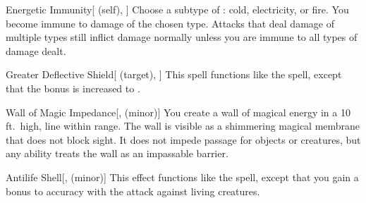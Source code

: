 \lowercase{\hypertarget{spell:Energetic Immunity}{}}\label{spell:Energetic Immunity}
\begin{attuneability}[Rank 5]{\hypertarget{spell:Energetic Immunity}{Energetic Immunity}}[ (self), ]
Choose a subtype of : cold, electricity, or fire.
You become immune to damage of the chosen type.
Attacks that deal damage of multiple types still inflict damage normally unless you are immune to all types of damage dealt.
\end{attuneability}
\vspace{0.25em}



\lowercase{\hypertarget{spell:Greater Deflective Shield}{}}\label{spell:Greater Deflective Shield}
\begin{attuneability}[Rank 5]{\hypertarget{spell:Greater Deflective Shield}{Greater Deflective Shield}}[ (target), ]
This spell functions like the  spell, except that the bonus is increased to .
\end{attuneability}
\vspace{0.25em}



\lowercase{\hypertarget{spell:Wall of Magic Impedance}{}}\label{spell:Wall of Magic Impedance}
\begin{freeability}[Rank 5]{\hypertarget{spell:Wall of Magic Impedance}{Wall of Magic Impedance}}[,  (minor)]
\targetrule
You create a wall of magical energy in a 10 ft.\ high, \areamed line within \rngmed range.
The wall is visible as a shimmering magical membrane that does not block sight.
It does not impede passage for objects or creatures, but any  ability treats the wall as an impassable barrier.
\end{freeability}
\vspace{0.25em}



\lowercase{\hypertarget{spell:Antilife Shell}{}}\label{spell:Antilife Shell}
\begin{freeability}[Rank 6]{\hypertarget{spell:Antilife Shell}{Antilife Shell}}[,  (minor)]
This effect functions like the  spell, except that you gain a  bonus to accuracy with the attack against living creatures.
\end{freeability}
\vspace{0.25em}



